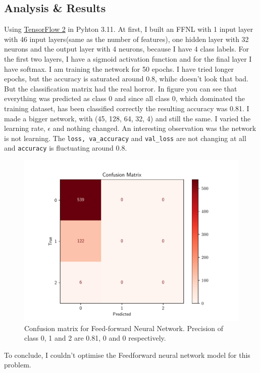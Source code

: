 \documentclass{article}
\begin{document}
\subsection{Analysis \& Results}
Using \href{https://www.tensorflow.org/api_docs/python/tf/all_symbols}{ TensorFlow 2} in Pyhton 3.11. At first, I 
built an FFNL with 1 input layer with 46 input layers(same as the number of features),
one hidden layer with 32 neurons and the output layer with 4 neurons, because I have 
4 class labels. For the first two layers, I have a sigmoid activation function and
for the final layer I have softmax. I am training the network for 50 epochs. I have 
tried longer epochs, but the accuracy is saturated around 0.8, whihc doesn't look that bad.
But the classification matrix had the real horror. In figure \label{fig:ffnlsums}
you can see that everything was predicted as class 0 and since all class 0,  which 
dominated the training dataset, has been classified correctly the resulting accuracy
was 0.81. 
I made a bigger network,  with (45, 128, 64, 32, 4) and still the same. I varied the 
learning rate, $\epsilon$ and nothing changed. An interesting observation was the 
network is not learning. The \texttt{loss, va\_accuracy} and \texttt{val\_loss} are not 
changing at all and \texttt{accuracy} is fluctuating around 0.8. 
\begin{figure}
    \centering
    \includegraphics[scale=.5]{FFNL_summary.pdf}
    \caption{Confusion matrix for Feed-forward Neural Network. Precision of
    class 0, 1 and 2 are 0.81, 0 and 0 respectively. }
    \label{fig:ffnlsum}
\end{figure}

To conclude, I couldn't optimise the Feedforward neural network model for this problem. 
\end{document}
